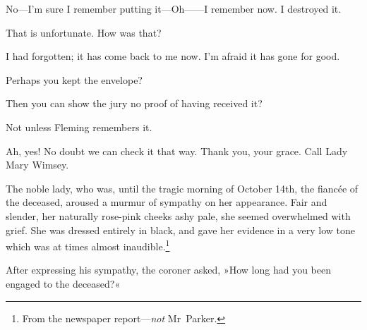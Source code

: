\begin{dialogue}
 No—I'm sure I remember putting it—Oh——I remember now. I destroyed it.

 That is unfortunate. How was that?

 I had forgotten; it has come back to me now. I'm afraid it has gone for good.

 Perhaps you kept the envelope?

 

 Then you can show the jury no proof of having received it?

 Not unless Fleming remembers it.

 Ah, yes! No doubt we can check it that way. Thank you, your grace. Call Lady Mary Wimsey.
\end{dialogue}

The noble lady, who was, until the tragic morning of October 14th, the fiancée of the deceased, aroused a murmur of sympathy on her appearance. Fair and slender, her naturally rose-pink cheeks ashy pale, she seemed overwhelmed with grief. She was dressed entirely in black, and gave her evidence in a very low tone which was at times almost inaudible.\footnote{From the newspaper report—\textit{not} Mr~Parker.}

After expressing his sympathy, the coroner asked, »How long had you been engaged to the deceased?«

